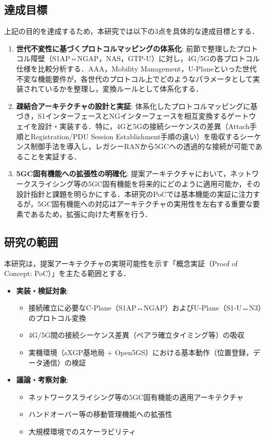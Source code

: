 \subsection{達成目標}

上記の目的を達成するため，本研究では以下の3点を具体的な達成目標とする．

\begin{enumerate}
    \item \textbf{世代不変性に基づくプロトコルマッピングの体系化}:
    前節で整理したプロトコル障壁（S1AP⇔NGAP，NAS，GTP-U）に対し，4G/5Gの各プロトコル仕様を比較分析する．AAA，Mobility Management，U-Planeといった世代不変な機能要件が，各世代のプロトコル上でどのようなパラメータとして実装されているかを整理し，変換ルールとして体系化する．

    \item \textbf{疎結合アーキテクチャの設計と実証}:
    体系化したプロトコルマッピングに基づき，S1インターフェースとNGインターフェースを相互変換するゲートウェイを設計・実装する．特に，4Gと5Gの接続シーケンスの差異（Attach手順とRegistration/PDU Session Establishment手順の違い）を吸収するシーケンス制御手法を導入し，レガシーRANから5GCへの透過的な接続が可能であることを実証する．

    \item \textbf{5GC固有機能への拡張性の明確化}:
    提案アーキテクチャにおいて，ネットワークスライシング等の5GC固有機能を将来的にどのように適用可能か，その設計指針と課題を明らかにする．本研究のPoCでは基本機能の実証に注力するが，5GC固有機能への対応はアーキテクチャの実用性を左右する重要な要素であるため，拡張に向けた考察を行う．
\end{enumerate}

\subsection{研究の範囲}

本研究は，提案アーキテクチャの実現可能性を示す「概念実証（Proof of Concept: PoC）」を主たる範囲とする．

\begin{itemize}
    \item \textbf{実装・検証対象}:
    \begin{itemize}
        \item 接続確立に必要なC-Plane（S1AP↔NGAP）およびU-Plane（S1-U↔N3）のプロトコル変換
        \item 4G/5G間の接続シーケンス差異（ベアラ確立タイミング等）の吸収
        \item 実機環境（sXGP基地局 + Open5GS）における基本動作（位置登録，データ通信）の検証
    \end{itemize}
    \item \textbf{議論・考察対象}:
    \begin{itemize}
        \item ネットワークスライシング等の5GC固有機能の適用アーキテクチャ
        \item ハンドオーバー等の移動管理機能への拡張性
        \item 大規模環境でのスケーラビリティ
    \end{itemize}
\end{itemize}

